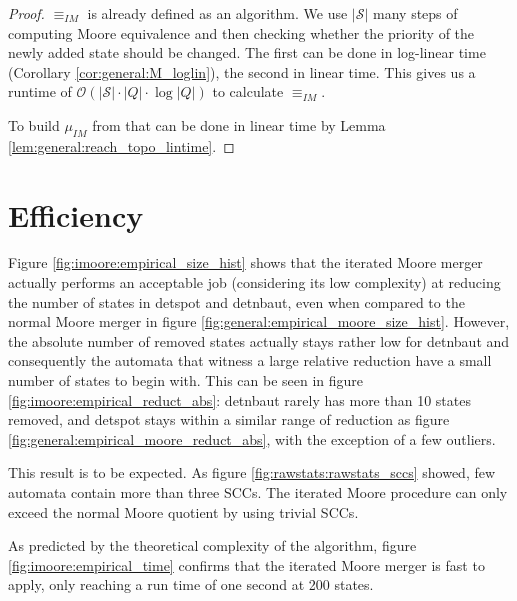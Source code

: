 \begin{proof}
	$\equiv_{IM}$ is already defined as an algorithm. We use $|\mathcal{S}|$ many steps of computing Moore equivalence and then checking whether the priority of the newly added state should be changed. The first can be done in log-linear time (Corollary \ref{cor:general:M_loglin}), the second in linear time. This gives us a runtime of $\mathcal{O}(|\mathcal{S}| \cdot |Q| \cdot \log |Q|)$ to calculate $\equiv_{IM}$.

	To build $\mu_{IM}$ from that can be done in linear time by Lemma \ref{lem:general:reach_topo_lintime}.
\end{proof}


\section{Efficiency}
Figure \ref{fig:imoore:empirical_size_hist} shows that the iterated Moore merger actually performs an acceptable job (considering its low complexity) at reducing the number of states in \textsf{detspot} and \textsf{detnbaut}, even when compared to the normal Moore merger in figure \ref{fig:general:empirical_moore_size_hist}. However, the absolute number of removed states actually stays rather low for \textsf{detnbaut} and consequently the automata that witness a large relative reduction have a small number of states to begin with. This can be seen in figure \ref{fig:imoore:empirical_reduct_abs}: \textsf{detnbaut} rarely has more than 10 states removed, and \textsf{detspot} stays within a similar range of reduction as figure \ref{fig:general:empirical_moore_reduct_abs}, with the exception of a few outliers.

This result is to be expected. As figure \ref{fig:rawstats:rawstats_sccs} showed, few automata contain more than three SCCs. The iterated Moore procedure can only exceed the normal Moore quotient by using trivial SCCs.

As predicted by the theoretical complexity of the algorithm, figure \ref{fig:imoore:empirical_time} confirms that the iterated Moore merger is fast to apply, only reaching a run time of one second at 200 states.


